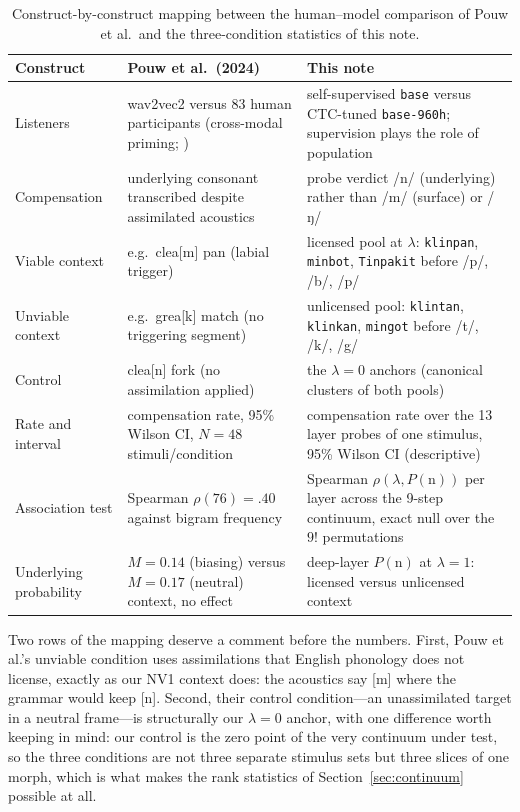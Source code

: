 \documentclass[11pt,a4paper]{article}
\newcommand{\sampa}[1]{\texttt{#1}}
\newcommand{\lam}{\lambda}
\begin{document}
\begin{table}[t]
\small
\begin{tabularx}{\textwidth}{@{}p{}YY@{}}
\toprule
\textbf{Construct} & \textbf{Pouw et al.\ (2024)} & \textbf{This note} \\
\midrule
Listeners & wav2vec2 versus 83 human participants (cross-modal
priming; \citealp{gmw2001}) & self-supervised \sampa{base} versus
CTC-tuned \sampa{base-960h}; supervision plays the role of population \\
Compensation & underlying consonant transcribed despite assimilated
acoustics & probe verdict /n/ (underlying) rather than /m/ (surface)
or /ŋ/ \\
Viable context & e.g.\ clea[m] pan (labial trigger) & licensed
pool at $\lam$: \sampa{klinpan}, \sampa{minbot}, \sampa{Tinpakit}
before /p/, /b/, /p/ \\
Unviable context & e.g.\ grea[k] match (no triggering segment) &
unlicensed pool: \sampa{klintan}, \sampa{klinkan}, \sampa{mingot}
before /t/, /k/, /g/ \\
Control & clea[n] fork (no assimilation applied) & the $\lam=0$
anchors (canonical clusters of both pools) \\
Rate and interval & compensation rate, 95\% Wilson CI, $N=48$
stimuli/condition & compensation rate over the 13 layer probes of one
stimulus, 95\% Wilson CI (descriptive) \\
Association test & Spearman $\rho(76)=.40$ against bigram frequency &
Spearman $\rho(\lam, P(\mathrm{n}))$ per layer across the 9-step
continuum, exact null over the $9!$ permutations \\
Underlying probability & $M=0.14$ (biasing) versus $M=0.17$ (neutral)
context, no effect & deep-layer $P(\mathrm{n})$ at $\lam=1$:
licensed versus unlicensed context \\
\bottomrule
\end{tabularx}
\caption{Construct-by-construct mapping between the human--model
comparison of Pouw et al.\ and the three-condition statistics of this
note.}
\label{tab:mapping}
\end{table}

Two rows of the mapping deserve a comment before the numbers. First,
Pouw et al.'s unviable condition uses assimilations that English
phonology does not license, exactly as our NV1 context does: the
acoustics say [m] where the grammar would keep [n]. Second, their
control condition---an unassimilated target in a neutral frame---is
structurally our $\lam=0$ anchor, with one difference worth keeping in
mind: our control is the zero point of the very continuum under test,
so the three conditions are not three separate stimulus sets but three
slices of one morph, which is what makes the rank statistics of
Section~\ref{sec:continuum} possible at all.
\end{document}
